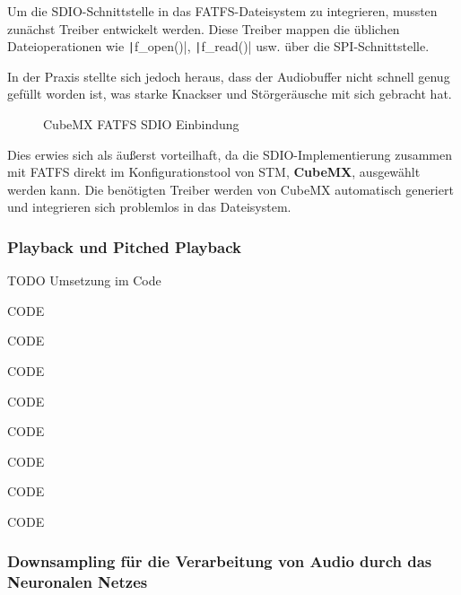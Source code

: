 Um die SDIO-Schnittstelle in das FATFS-Dateisystem zu integrieren, mussten zunächst Treiber entwickelt werden. Diese Treiber mappen die üblichen Dateioperationen wie \texttt|f_open()|, \texttt|f_read()| usw. über die SPI-Schnittstelle.


In der Praxis stellte sich jedoch heraus, dass der Audiobuffer nicht schnell genug gefüllt worden ist, was starke Knackser und Störgeräusche mit sich gebracht hat.

\begin{figure} %
	\vspace{-30pt + 0.02\textwidth}
	\hspace{0.02\textwidth} %
	\caption{CubeMX FATFS SDIO Einbindung}
	\label{fig:cubemx_sdio}
\end{figure}

Dies erwies sich als äußerst vorteilhaft, da die SDIO-Implementierung zusammen mit FATFS direkt im Konfigurationstool von STM, \textbf{CubeMX}, ausgewählt werden kann. Die benötigten Treiber werden von CubeMX automatisch generiert und integrieren sich problemlos in das Dateisystem.

\subsubsection{Playback und Pitched Playback}


TODO Umsetzung im Code

CODE 

CODE 

CODE 

CODE 

CODE 

CODE 

CODE

CODE 


\subsubsection{Downsampling für die Verarbeitung von Audio durch das Neuronalen Netzes}
\label{sec:audio-downsampling}


